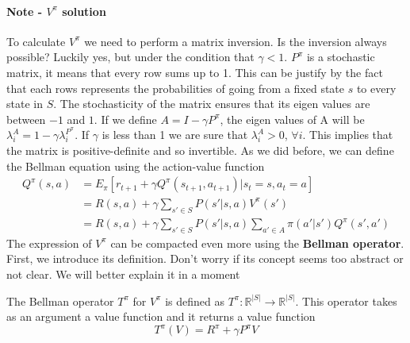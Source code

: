 \documentclass[../main.tex]{subfiles}
\begin{document}
\paragraph{Note - $V^{\pi}$ solution} To calculate $V^{\pi}$ we need to perform a matrix inversion. Is the inversion always possible? Luckily yes, but under the condition that $\gamma<1$. $P^{\pi}$ is a stochastic matrix, it means that every row sums up to 1. This can be justify by the fact that each rows represents the probabilities of going from a fixed state $s$ to every state in $S$. The stochasticity of the matrix ensures that its eigen values are between $-1$ and $1$. If we define $A = I - \gamma P^{\pi}$, the eigen values of A will be $\lambda_i^A = 1 - \gamma \lambda_i^{P^{\pi}}$. If $\gamma$ is less than 1 we are sure that $\lambda_i^A > 0$, $\forall i$. This implies that the matrix is positive-definite and so invertible.
\newline
\newline
As we did before, we can define the Bellman equation using the action-value function
\begin{align*}
    Q^{\pi}(s,a) & = E_{\pi}[r_{t+1} + \gamma Q^{\pi}(s_{t+1},a_{t+1})|s_t=s,a_t=a]                     \\
                 & = R(s,a) + \gamma \sum_{s' \in S} P(s'|s,a)V^{\pi}(s')                               \\
                 & = R(s,a) + \gamma \sum_{s' \in S} P(s'|s,a) \sum_{a' \in A} \pi(a'|s')Q^{\pi}(s',a')
\end{align*}
The expression of $V^{\pi}$ can be compacted even more using the \textbf{Bellman operator}.
First, we introduce its definition. Don't worry if its concept seems too abstract or not clear. We will better explain it in a moment
\begin{definition}
    The Bellman operator $T^{\pi}$ for $V^{\pi}$ is defined as $T^{\pi}:\mathbb{R}^{|S|} \rightarrow \mathbb{R}^{|S|}$. This operator takes as an argument a value function and it returns a value function \footnotemark {}
    \begin{equation*}
        T^{\pi}(V) = R^{\pi} + \gamma P^{\pi} V
    \end{equation*}
\end{definition}
\end{document}

